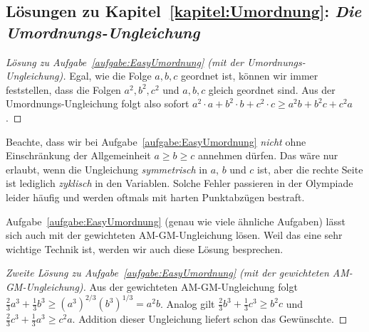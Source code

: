 \subsection*{Lösungen zu Kapitel~\ref{kapitel:Umordnung}: \emph{Die Umordnungs-Ungleichung}}

\begin{proof}[Lösung zu Aufgabe~\ref{aufgabe:EasyUmordnung} \textmd{(mit der Umordnungs-Ungleichung)}]
	Egal, wie die Folge $a,b,c$ geordnet ist, können wir immer feststellen, dass die Folgen $a^2,b^2,c^2$ und $a,b,c$ gleich geordnet sind. Aus der Umordnungs-Ungleichung folgt also sofort $a^2\cdot a+b^2\cdot b+c^2\cdot c\geqslant a^2b+b^2c+c^2a$.
\end{proof}
Beachte, dass wir bei Aufgabe~\ref{aufgabe:EasyUmordnung} \emph{nicht} ohne Einschränkung der Allgemeinheit $a\geqslant b\geqslant c$ annehmen dürfen. Das wäre nur erlaubt, wenn die Ungleichung \emph{symmetrisch} in $a$, $b$ und $c$ ist, aber die rechte Seite ist lediglich \emph{zyklisch} in den Variablen. Solche Fehler passieren in der Olympiade leider häufig und werden oftmals mit harten Punktabzügen bestraft.

Aufgabe~\ref{aufgabe:EasyUmordnung} (genau wie viele ähnliche Aufgaben) lässt sich auch mit der gewichteten AM-GM-Ungleichung lösen. Weil das eine sehr wichtige Technik ist, werden wir auch diese Lösung besprechen.

\begin{proof}[Zweite Lösung zu Aufgabe~\ref{aufgabe:EasyUmordnung} \textmd{(mit der gewichteten AM-GM-Ungleichung)}]
	Aus der gewichteten AM-GM-Ungleichung folgt $\frac23a^3+\frac13b^3\geqslant (a^3)^{2/3}(b^3)^{1/3}=a^2b$. Analog gilt $\frac23b^3+\frac13c^3\geqslant b^2c$ und $\frac23c^3+\frac13a^3\geqslant c^2a$. Addition dieser Ungleichung liefert schon das Gewünschte.
\end{proof}

